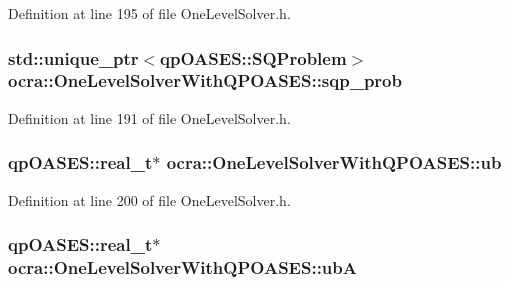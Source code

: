 Definition at line 195 of file One\+Level\+Solver.\+h.

\subsubsection[{\texorpdfstring{sqp\+\_\+prob}{sqp_prob}}]{\setlength{\rightskip}{0pt plus 5cm}std\+::unique\+\_\+ptr$<$qp\+O\+A\+S\+E\+S\+::\+S\+Q\+Problem$>$ ocra\+::\+One\+Level\+Solver\+With\+Q\+P\+O\+A\+S\+E\+S\+::sqp\+\_\+prob\hspace{0.3cm}{\ttfamily [protected]}}\hypertarget{classocra_1_1OneLevelSolverWithQPOASES_ad432bd42a6211d668efc3b2e2d3df238}{}\label{classocra_1_1OneLevelSolverWithQPOASES_ad432bd42a6211d668efc3b2e2d3df238}


Definition at line 191 of file One\+Level\+Solver.\+h.

\subsubsection[{\texorpdfstring{ub}{ub}}]{\setlength{\rightskip}{0pt plus 5cm}qp\+O\+A\+S\+E\+S\+::real\+\_\+t$\ast$ ocra\+::\+One\+Level\+Solver\+With\+Q\+P\+O\+A\+S\+E\+S\+::ub\hspace{0.3cm}{\ttfamily [protected]}}\hypertarget{classocra_1_1OneLevelSolverWithQPOASES_a53854c9775b3ff65f4a0621bab17613c}{}\label{classocra_1_1OneLevelSolverWithQPOASES_a53854c9775b3ff65f4a0621bab17613c}


Definition at line 200 of file One\+Level\+Solver.\+h.

\subsubsection[{\texorpdfstring{ubA}{ubA}}]{\setlength{\rightskip}{0pt plus 5cm}qp\+O\+A\+S\+E\+S\+::real\+\_\+t$\ast$ ocra\+::\+One\+Level\+Solver\+With\+Q\+P\+O\+A\+S\+E\+S\+::ubA\hspace{0.3cm}{\ttfamily [protected]}}\hypertarget{classocra_1_1OneLevelSolverWithQPOASES_a2cb624cfce8e1940c5107251418ee7dd}{}\label{classocra_1_1OneLevelSolverWithQPOASES_a2cb624cfce8e1940c5107251418ee7dd}


